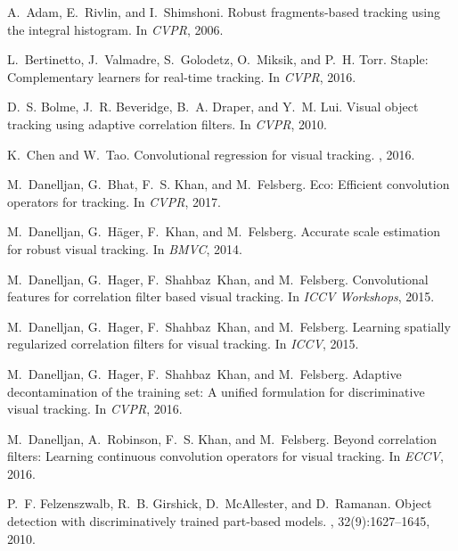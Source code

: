 \documentclass[10pt,twocolumn,letterpaper]{article}
\begin{document}
{\small

\begin{thebibliography}{10}\itemsep=-1pt

A.~Adam, E.~Rivlin, and I.~Shimshoni.
\newblock Robust fragments-based tracking using the integral histogram.
\newblock In {\em CVPR}, 2006.

L.~Bertinetto, J.~Valmadre, S.~Golodetz, O.~Miksik, and P.~H. Torr.
\newblock Staple: Complementary learners for real-time tracking.
\newblock In {\em CVPR}, 2016.

D.~S. Bolme, J.~R. Beveridge, B.~A. Draper, and Y.~M. Lui.
\newblock Visual object tracking using adaptive correlation filters.
\newblock In {\em CVPR}, 2010.

K.~Chen and W.~Tao.
\newblock Convolutional regression for visual tracking.
, 2016.

M.~Danelljan, G.~Bhat, F.~S. Khan, and M.~Felsberg.
\newblock Eco: Efficient convolution operators for tracking.
\newblock In {\em CVPR}, 2017.

M.~Danelljan, G.~H{\"a}ger, F.~Khan, and M.~Felsberg.
\newblock Accurate scale estimation for robust visual tracking.
\newblock In {\em BMVC}, 2014.

M.~Danelljan, G.~Hager, F.~Shahbaz~Khan, and M.~Felsberg.
\newblock Convolutional features for correlation filter based visual tracking.
\newblock In {\em ICCV Workshops}, 2015.

M.~Danelljan, G.~Hager, F.~Shahbaz~Khan, and M.~Felsberg.
\newblock Learning spatially regularized correlation filters for visual
  tracking.
\newblock In {\em ICCV}, 2015.

M.~Danelljan, G.~Hager, F.~Shahbaz~Khan, and M.~Felsberg.
\newblock Adaptive decontamination of the training set: A unified formulation
  for discriminative visual tracking.
\newblock In {\em CVPR}, 2016.

M.~Danelljan, A.~Robinson, F.~S. Khan, and M.~Felsberg.
\newblock Beyond correlation filters: Learning continuous convolution operators
  for visual tracking.
\newblock In {\em ECCV}, 2016.

P.~F. Felzenszwalb, R.~B. Girshick, D.~McAllester, and D.~Ramanan.
\newblock Object detection with discriminatively trained part-based models.
,
  32(9):1627--1645, 2010.


\end{thebibliography}}
\end{document}
